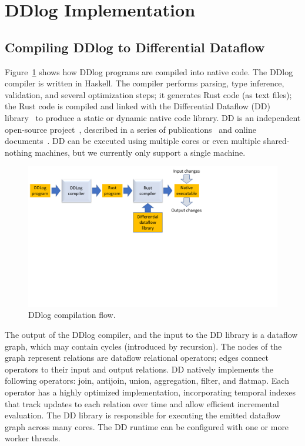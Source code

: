 \section{DDlog Implementation}\label{sec-system}

\subsection{Compiling DDlog to Differential Dataflow}

Figure~\ref{fig:compiler-flow} shows how DDlog programs are compiled
into native code.  The DDlog compiler is written in Haskell.  The
compiler performs parsing, type inference, validation, and several
optimization steps; it generates Rust code (as text files); the Rust
code is compiled and linked with the Differential Dataflow (DD)
library~\cite{differential-dataflow} to produce a static or dynamic
native code library.  DD is an independent open-source
project~\cite{differential-dataflow}, described in a series of
publications~\cite{timely-dataflow,differential-dataflow-paper} and
online documents~\cite{dd-mdbook,dd-reference}.  DD can be executed
using multiple cores or even multiple shared-nothing machines, but we
currently only support a single machine.

\begin{figure}
    \includegraphics[width=\columnwidth,clip=true,trim=0in 4in 4in
      0in]{compiler-flow.pdf}
    \caption{DDlog compilation flow.\label{fig:compiler-flow}}
\end{figure}


The output of the DDlog compiler, and the input to the DD library is a
dataflow graph, which may contain cycles (introduced by
recursion).  The nodes of the graph represent relations are dataflow
relational operators; edges connect operators to their input and output
relations.  DD natively implements
the following operators: join, antijoin, union, aggregation,
filter, and flatmap.  Each operator has a highly optimized
implementation, incorporating temporal indexes that track
updates to each relation over time and allow efficient incremental evaluation.
The DD library is responsible for executing the emitted
dataflow graph across many cores.  The
DD runtime can be configured with one or more worker threads.

